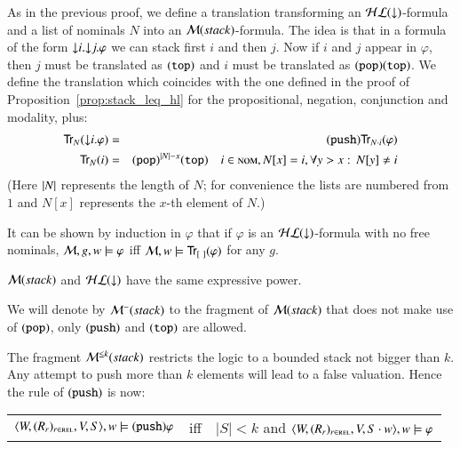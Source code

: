 \begin{pf}
As in the previous proof, we define a translation transforming an
$\mathcal{HL}({\downarrow})$-formula and a list of nominals $N$ into an $\mathcal{M}(stack)$-formula.
The idea is that in a formula of the form ${\downarrow} i.{\downarrow} j.\varphi$
we can stack first $i$ and then $j$. Now if $i$ and $j$ appear in
$\varphi$, then $j$ must be translated as ${\tt (top)}$ and  $i$ must be
translated as ${\tt (pop)}{\tt (top)}$. We define the translation which coincides
with the one defined in the proof of
Proposition~\ref{prop:stack_leq_hl} for the propositional, negation,
conjunction and modality, plus:
\begin{eqnarray*}
{\sf Tr}_N({\downarrow} i.\varphi) & = & {\tt (push)}{\sf Tr}_{N\cdot i}(\varphi)\\
{\sf Tr}_N(i) & = & {\tt (pop)}^{|N|-x}{\tt (top)} \quad i \in \textsc{nom}, N[x]=i,
\forall y>x:\, N[y]\not=i
\end{eqnarray*}
(Here $|N|$ represents the length of $N$; for convenience the
lists are numbered from $1$ and $N[x]$ represents the $x$-th element
of $N$.)

It can be shown by induction in $\varphi$ that if $\varphi$ is an
$\mathcal{HL}({\downarrow})$-formula with no free nominals, $\mathcal{M}, g, w \models
\varphi$ iff $\model, w \models \Tr_{[\ ]}(\varphi)$ for any $g$.
\end{pf}

\begin{cor}
$\mathcal{M}(stack)$ and $\mathcal{HL}({\downarrow})$ have the same expressive power.
\end{cor}

We will denote by $\mathcal{M}^-(stack)$ to the fragment of $\mathcal{M}(stack)$ that does not
make use of ${\tt (pop)}$, only ${\tt (push)}$ and ${\tt (top)}$ are allowed.

The fragment $\mathcal{M}^{\leq k}(stack)$ restricts the logic to a bounded stack
not bigger than $k$. Any attempt to push more than $k$ elements will
lead to a false valuation. Hence the rule of ${\tt (push)}$ is now:
\begin{center}
\begin{tabular}{rcl}
$\langle W,(R_r)_{r \in \textsc{rel}},V,S \rangle,w \models {\tt (push)} \varphi$ &
 iff & $|S|<k$ and $\langle W,(R_r)_{r \in \textsc{rel}},V,S\cdot w \rangle,w \models \varphi$
\end{tabular}
\end{center}


